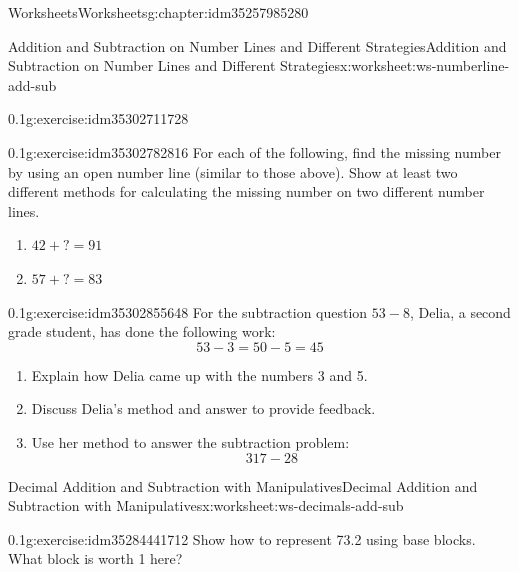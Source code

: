 \documentclass[twoside,11pt,]{book}
\begin{document}
\begin{chapterptx}{Worksheets}{}{Worksheets}{}{}{g:chapter:idm35257985280}
\begin{worksheet-section-numberless}{Addition and Subtraction on Number Lines and Different Strategies}{}{Addition and Subtraction on Number Lines and Different Strategies}{}{}{x:worksheet:ws-numberline-add-sub}
\begin{divisionexercise}{1}{}{0.1}{g:exercise:idm35302711728}
\begin{enumerate}[label=(\alph*)]
\begin{sidebyside}{1}{0.15}{0.15}{0}
\begin{sbspanel}{0.7}
\end{sbspanel}%
\end{sidebyside}%
%
\end{enumerate}
\end{divisionexercise}%
\begin{divisionexercise}{2}{}{0.1}{g:exercise:idm35302782816}%
For each of the following, find the missing number by using an open number line (similar to those above).  Show at least two different methods for calculating the missing number on two different number lines.%
%
\begin{enumerate}[label=(\alph*)]
\item{}\(42+?=91 \)%
\item{}\(57+?=83 \)%
\end{enumerate}
\end{divisionexercise}%
\begin{divisionexercise}{3}{}{0.1}{g:exercise:idm35302855648}%
For the subtraction question \(53-8\), Delia, a second grade student, has done the following work:%
\begin{equation*}
53- 3=50-5=45
\end{equation*}
%
%
\begin{enumerate}[label=(\alph*)]
\item{}Explain how Delia came up with the numbers 3 and 5.%
\item{}Discuss Delia's method and answer to provide feedback.%
\item{}Use her method to answer the subtraction problem:%
\begin{equation*}
317-28
\end{equation*}
%
\end{enumerate}
\end{divisionexercise}%
\end{worksheet-section-numberless}
\restoregeometry
%
%
\typeout{************************************************}
\typeout{************************************************}
%
\begin{worksheet-section-numberless}{Decimal Addition and Subtraction with Manipulatives}{}{Decimal Addition and Subtraction with Manipulatives}{}{}{x:worksheet:ws-decimals-add-sub}
\begin{divisionexercise}{1}{}{0.1}{g:exercise:idm35284441712}%
Show how to represent 73.2 using base blocks.  What block is worth 1 here?%
\end{divisionexercise}%

\end{worksheet-section-numberless}
\end{chapterptx}
\end{document}
